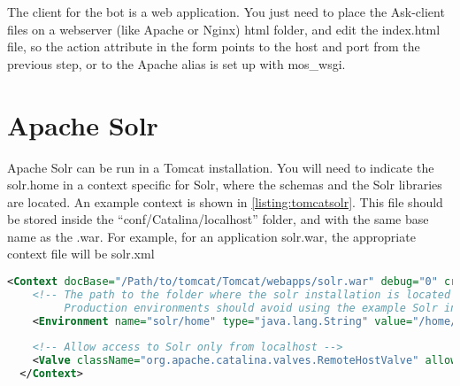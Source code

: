 The client for the bot is a web application. You just need to place the Ask-client files on a webserver (like Apache or Nginx) html folder, and edit the index.html file, so the action attribute in the form points to the host and port from the previous step, or to the Apache alias is set up with mos\_wsgi.

\section{Apache Solr}

Apache Solr can be run in a Tomcat installation. You will need to indicate the solr.home in a context specific for Solr, where the schemas and the Solr libraries are located. An example context is shown in \ref{listing:tomcatsolr}. This file should be stored inside the ``conf/Catalina/localhost'' folder, and with the same base name as the .war. For example, for an application solr.war, the appropriate context file will be solr.xml
\begin{center} 
  \begin{lstlisting}[language=XML, captionpos=b, caption=Tomcat context for solr, label=listing:tomcatsolr]
  <Context docBase="/Path/to/tomcat/Tomcat/webapps/solr.war" debug="0" crossContext="true">
    <!-- The path to the folder where the solr installation is located 
         Production environments should avoid using the example Solr instance -->
    <Environment name="solr/home" type="java.lang.String" value="/home/amardomingo/PFC/Solr/example/solr" override="true"/>
    
    <!-- Allow access to Solr only from localhost -->
    <Valve className="org.apache.catalina.valves.RemoteHostValve" allow="localhost"/>
  </Context>
  \end{lstlisting}
\end{center}
